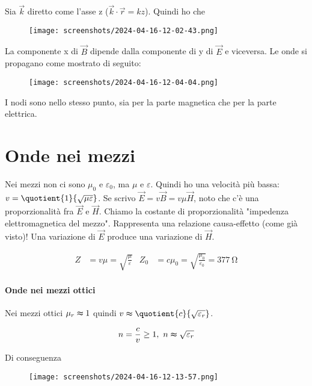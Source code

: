 Sia \(\vec{k}\) diretto come l'asse z (\(\vec{k}\cdot \vec{r}=kz\)). Quindi ho che 
\begin{figure}[H]
	\centering
	\texttt{[image: screenshots/2024-04-16-12-02-43.png]}
\end{figure}
La componente x di \(\vec{B}\) dipende dalla componente di y di \(\vec{E}\) e viceversa. Le onde si propagano come mostrato di seguito:
\begin{figure}[H]
	\centering
	\texttt{[image: screenshots/2024-04-16-12-04-04.png]}
\end{figure}
I nodi sono nello stesso punto, sia per la parte magnetica che per la parte elettrica.

\section{Onde nei mezzi}
Nei mezzi non ci sono \(\mu _0\) e \(\varepsilon_0\), ma \(\mu\) e \(\varepsilon \). Quindi ho una velocità più bassa: \(v=\quotient{1}{\sqrt{\mu \varepsilon } } \). Se scrivo \(\vec{E}=v \vec{B}=v \mu \vec{H}\), noto che c'è una proporzionalità fra \(\vec{E}\) e \(\vec{H}\). Chiamo la costante di proporzionalità "impedenza elettromagnetica del mezzo". Rappresenta una relazione causa-effetto (come già visto)! Una variazione di \(\vec{E}\) produce una variazione di \(\vec{H}\).

\begin{definition}
	\begin{align}
		Z &= v \mu = \sqrt{\frac{\mu }{\varepsilon }} & 
		Z_0 &= c \mu _0 = \sqrt{\frac{\mu _0}{\varepsilon _0}}=\SI{377}{\ohm} 
	\end{align}
\end{definition}

\paragraph{Onde nei mezzi ottici}
Nei mezzi ottici \(\mu _r \thickapprox 1\) quindi \(v\thickapprox \quotient{c}{\sqrt{\varepsilon _r} } \).
\begin{definition}
	\begin{equation}
		n=\frac{c}{v}\geq 1,\ n \thickapprox \sqrt{\varepsilon _r} 
	\end{equation}	
\end{definition}
Di conseguenza
\begin{figure}[H]
	\centering
	\texttt{[image: screenshots/2024-04-16-12-13-57.png]}
\end{figure}

